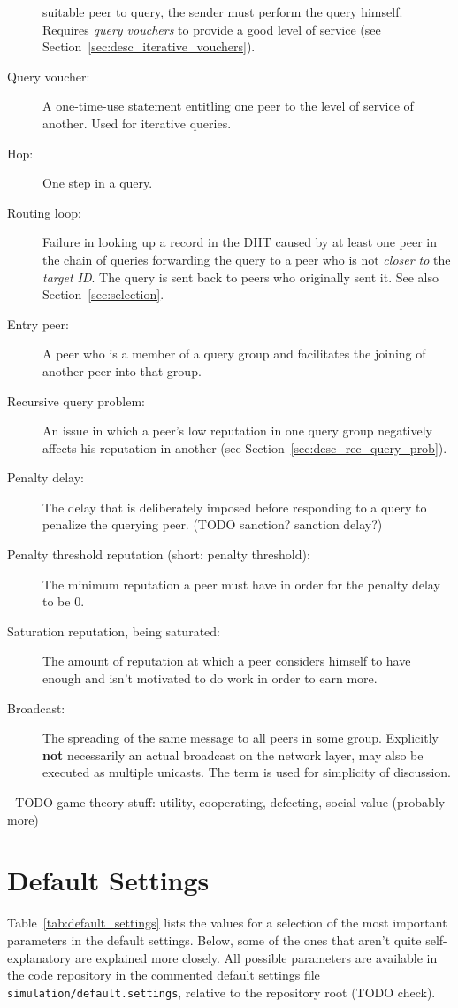 \begin{description}
suitable peer to query, the sender must perform the query himself. Requires
\emph{query vouchers} to provide a good level of service (see
Section~\ref{sec:desc_iterative_vouchers}).
\item[Query voucher:] A one-time-use statement entitling one peer to the level
of service of another. Used for iterative queries.
\item[Hop:] One step in a query.
\item[Routing loop:] Failure in looking up a record in the \ac{DHT} caused by at
least one peer in the chain of queries forwarding the query to a peer who is not
\emph{closer to} the \emph{target ID}. The query is sent back to peers who
originally sent it. See also Section~\ref{sec:selection}.
\item[Entry peer:] A peer who is a member of a query group and facilitates the
joining of another peer into that group.
\item[Recursive query problem:] An issue in which a peer's low reputation in one
query group negatively affects his reputation in another (see
Section~\ref{sec:desc_rec_query_prob}).
\item[Penalty delay:] The delay that is deliberately imposed before responding
to a query to penalize the querying peer. (TODO sanction? sanction delay?)
\item[Penalty threshold reputation (short: penalty threshold):] The minimum
reputation a peer must have in order for the penalty delay to be 0.
\item[Saturation reputation, being saturated:] The amount of reputation at which
a peer considers himself to have enough and isn't motivated to do work in order
to earn more.
\item[Broadcast:] The spreading of the same message to all peers in some group.
Explicitly \textbf{not} necessarily an actual broadcast on the network layer,
may also be executed as multiple unicasts. The term is used for simplicity of
discussion.
\end{description}

- TODO game theory stuff: utility, cooperating, defecting, social value (probably
  more)

\section{Default Settings}
\label{sec:app_default_settings}
Table~\ref{tab:default_settings} lists the values for a selection of the most
important parameters in the default settings. Below, some of the ones that
aren't quite self-explanatory are explained more closely. All possible
parameters are available in the code repository in the commented default
settings file \texttt{simulation/default.settings}, relative to the repository
root (TODO check).

